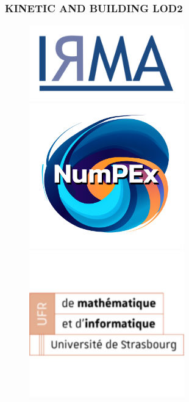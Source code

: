 \documentclass[10pt]{beamer}
\begin{document}
\begin{frame}
\frametitle{KINETIC AND BUILDING LOD2}
\begin{figure}

    \begin{minipage}{0.33\textwidth}
        \centering
        \includegraphics[width=0.6\textwidth]{../image/logo_irma.png}
    \end{minipage}%
    \begin{minipage}{0.33\textwidth}
        \centering
        \includegraphics[width=0.6\textwidth]{../image/logo-numpex-web-2.png}
    \end{minipage}%
    \begin{minipage}{0.33\textwidth}
        \centering
        \includegraphics[width=0.6\textwidth]{../image/logo-ufr-mathinfo-unistra-1.jpg}
    \end{minipage}
    

\end{figure}
\end{frame}
\end{document}
